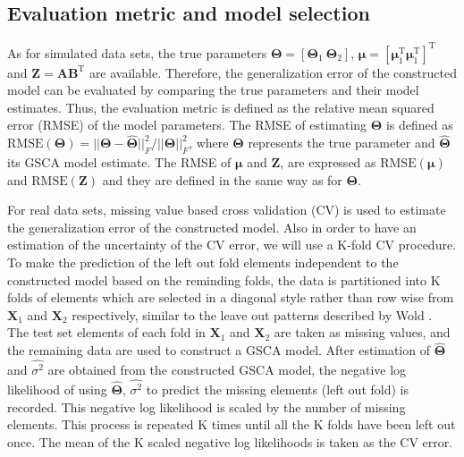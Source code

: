 \subsection{Evaluation metric and model selection}
As for simulated data sets, the true parameters $\mathbf{\Theta} = [\mathbf{\Theta}_1~\mathbf{\Theta}_2]$, $\bm{\mu} = [\bm{\mu}_1^{\text{T}} \bm{\mu}_1^{\text{T}}]^{\text{T}}$ and $\mathbf{Z} = \mathbf{A}\mathbf{B}^{\text{T}}$ are available. Therefore, the generalization error of the constructed model can be evaluated by comparing the true parameters and their model estimates. Thus, the evaluation metric is defined as the relative mean squared error (RMSE) of the model parameters. The RMSE of estimating $\mathbf{\Theta}$ is defined as $\text{RMSE}(\mathbf{\Theta}) = ||\mathbf{\Theta}-\hat{\mathbf{\Theta}}||_F^2/||\mathbf{\Theta}||_F^2$, where $\mathbf{\Theta}$ represents the true parameter and $\hat{\mathbf{\Theta}}$ its GSCA model estimate. The RMSE of $\bm{\mu}$ and $\mathbf{Z}$, are expressed as $\text{RMSE}(\bm{\mu})$ and $\text{RMSE}(\mathbf{Z})$ and they are defined in the same way as for $\mathbf{\Theta}$.

For real data sets, missing value based cross validation (CV) is used to estimate the generalization error of the constructed model. Also in order to have an estimation of the uncertainty of the CV error, we will use a K-fold CV procedure. To make the prediction of the left out fold elements independent to the constructed model based on the reminding folds, the data is partitioned into K folds of elements which are selected in a diagonal style rather than row wise from $\mathbf{X}_1$ and $\mathbf{X}_2$ respectively, similar to the leave out patterns described by Wold \cite{wold1978cross, bro2008cross}. The test set elements of each fold in $\mathbf{X}_1$ and $\mathbf{X}_2$ are taken as missing values, and the remaining data are used to construct a GSCA model. After estimation of $\hat{\mathbf{\Theta}}$ and $\hat{\sigma^2}$ are obtained from the constructed GSCA model, the negative log likelihood of using $\hat{\mathbf{\Theta}}$, $\hat{\sigma^2}$ to predict the missing elements (left out fold) is recorded. This negative log likelihood is scaled by the number of missing elements. This process is repeated K times until all the K folds have been left out once. The mean of the K scaled negative log likelihoods is taken as the CV error.

